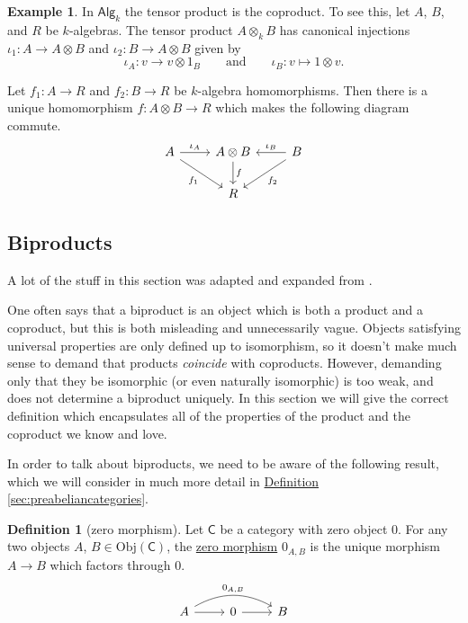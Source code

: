 \documentclass[a4paper,10pt]{scrreprt}
\newcommand{\defn}[1]{\ul{#1}}
\newcommand{\Obj}{\mathrm{Obj}}
\theoremstyle{definition}
\newtheorem{definition}{Definition}[section]
\newtheorem{example}{Example}[section]
\theoremstyle{plain}
\theoremstyle{remark}
\begin{document}
\begin{example}
  In $\mathsf{Alg}_{k}$ the tensor product is the coproduct. To see this, let $A$, $B$, and $R$ be $k$-algebras. The tensor product $A \otimes_{k} B$ has canonical injections $\iota_{1}\colon A \to A \otimes B$ and $\iota_{2}\colon B \to A \otimes B$ given by
  \begin{equation*}
    \iota_{A}\colon v \to v \otimes 1_{B}\qquad\text{and}\qquad \iota_{B}\colon v \mapsto 1 \otimes v.
  \end{equation*}
  
  Let $f_{1}\colon A \to R$ and $f_{2}\colon B \to R$ be $k$-algebra homomorphisms. Then there is a unique homomorphism $f\colon A \otimes B \to R$ which makes the following diagram commute.
  \begin{equation*}
    \begin{tikzcd}
      A
      \arrow[r, "\iota_{A}"]
      \arrow[dr, swap, "f_{1}"]
      & A \otimes B
      \arrow[d, "f"]
      & B
      \arrow[l, swap, "\iota_{B}"]
      \arrow[dl, "f_{2}"]
      \\
      & R
    \end{tikzcd}
  \end{equation*}
\end{example}

\subsection{Biproducts} \label{sec:biproducts}
A lot of the stuff in this section was adapted and expanded from \cite{annoying-precision-meditation}.

One often says that a biproduct is an object which is both a product and a coproduct, but this is both misleading and unnecessarily vague. Objects satisfying universal properties are only defined up to isomorphism, so it doesn't make much sense to demand that products \emph{coincide} with coproducts. However, demanding only that they be isomorphic (or even naturally isomorphic) is too weak, and does not determine a biproduct uniquely. In this section we will give the correct definition which encapsulates all of the properties of the product and the coproduct we know and love.

In order to talk about biproducts, we need to be aware of the following result, which we will consider in much more detail in \hyperref[sec:preabeliancategories]{Definition \ref*{sec:preabeliancategories}}.

\begin{definition}[zero morphism]
  Let $\mathsf{C}$ be a category with zero object $0$. For any two objects $A$, $B \in \Obj(\mathsf{C})$, the \defn{zero morphism} $0_{A,B}$ is the unique morphism $A \to B$ which factors through $0$.
  \begin{equation*}
    \begin{tikzcd}
      A
      \arrow[rr, bend left, "0_{A, B}"]
      \arrow[r]
      & 0
      \arrow[r]
      & B
    \end{tikzcd}
  \end{equation*}
\end{definition}
\end{document}
